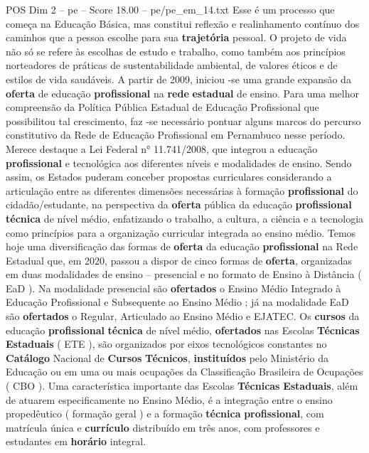 \begin{textsample}{POS Dim 2 – pe – Score 18.00 – pe/pe\_em\_14.txt}
Esse é um processo que começa na Educação Básica, mas constitui reflexão e realinhamento contínuo dos caminhos que a pessoa escolhe para sua \textbf{trajetória} pessoal.
O projeto de vida não só se refere às escolhas de estudo e trabalho, como também aos princípios norteadores de práticas de sustentabilidade ambiental, de valores éticos e de estilos de vida saudáveis.
A partir de 2009, iniciou -se uma grande expansão da \textbf{oferta} de educação \textbf{profissional} na \textbf{rede} \textbf{estadual} de ensino.
Para uma melhor compreensão da Política Pública Estadual de Educação Profissional que possibilitou tal crescimento, faz -se necessário pontuar alguns marcos do percurso constitutivo da Rede de Educação Profissional em Pernambuco nesse período.
Merece destaque a Lei Federal n{\EmojiFont °} 11.741/2008, que integrou a educação \textbf{profissional} e tecnológica aos diferentes níveis e modalidades de ensino.
Sendo assim, os Estados puderam conceber propostas curriculares considerando a articulação entre as diferentes dimensões necessárias à formação \textbf{profissional} do cidadão/estudante, na perspectiva da \textbf{oferta} pública da educação \textbf{profissional} \textbf{técnica} de nível médio, enfatizando o trabalho, a cultura, a ciência e a tecnologia como princípios para a organização curricular integrada ao ensino médio.
Temos hoje uma diversificação das formas de \textbf{oferta} da educação \textbf{profissional} na Rede Estadual que, em 2020, passou a dispor de cinco formas de \textbf{oferta}, organizadas em duas modalidades de ensino – presencial e no formato de Ensino à Distância ( EaD ).
Na modalidade presencial são \textbf{ofertados} o Ensino Médio Integrado à Educação Profissional e Subsequente ao Ensino Médio ; já na modalidade EaD são \textbf{ofertados} o Regular, Articulado ao Ensino Médio e EJATEC.
Os \textbf{cursos} da educação \textbf{profissional} \textbf{técnica} de nível médio, \textbf{ofertados} nas Escolas \textbf{Técnicas} \textbf{Estaduais} ( ETE ), são organizados por eixos tecnológicos constantes no \textbf{Catálogo} Nacional de \textbf{Cursos} \textbf{Técnicos}, \textbf{instituídos} pelo Ministério da Educação ou em uma ou mais ocupações da Classificação Brasileira de Ocupações ( CBO ).
Uma característica importante das Escolas \textbf{Técnicas} \textbf{Estaduais}, além de atuarem especificamente no Ensino Médio, é a integração entre o ensino propedêutico ( formação geral ) e a formação \textbf{técnica} \textbf{profissional}, com matrícula única e \textbf{currículo} distribuído em três anos, com professores e estudantes em \textbf{horário} integral.

\end{textsample}
